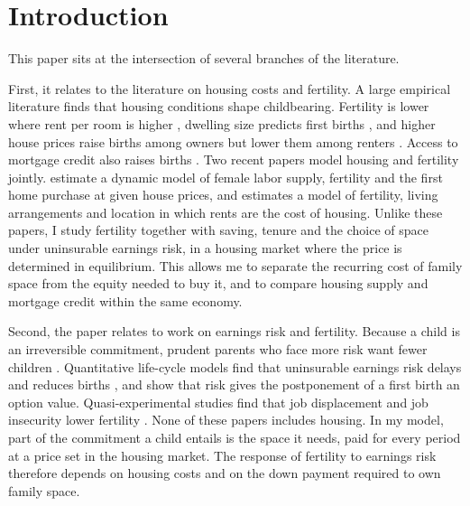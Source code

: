 \section{Introduction}
\label{sec:introduction}


This paper sits at the intersection of several branches of the literature.

First, it relates to the literature on housing costs and fertility. A large
empirical literature finds that housing conditions shape childbearing.
Fertility is lower where rent per room is higher
\citep{simonTamuraHigherRents2009}, dwelling size predicts first births
\citep{stromHousingFirstBirths2010}, and higher house prices raise births
among owners but lower them among renters
\citep{dettlingHousePricesBirth2014,lovenheimFamilyWealthShocks2013}. Access
to mortgage credit also raises births
\citep{hacamoBabiesMortgageDeregulation2021,cummingMonetaryPolicyBirth2024,dettlingKearneyModernMortgage2025,vandoornikFazioRamadoraiSkrastinsHousingFertility2025}.
Two recent papers model housing and fertility jointly.
\citet{khorunzhinaMillerAmericanDream2022} estimate a dynamic model of female
labor supply, fertility and the first home purchase at given house prices,
and \citet{couillardBuildBabyBuild2025} estimates a model of fertility,
living arrangements and location in which rents are the cost of housing.
Unlike these papers, I study fertility together with saving, tenure and the
choice of space under uninsurable earnings risk, in a housing market where
the price is determined in equilibrium. This allows me to separate the
recurring cost of family space from the equity needed to buy it, and to
compare housing supply and mortgage credit within the same economy.

Second, the paper relates to work on earnings risk and fertility. Because a
child is an irreversible commitment, prudent parents who face more risk want
fewer children \citep{fraserIncomeRisk2001}. Quantitative life-cycle models
find that uninsurable earnings risk delays and reduces births
\citep{sommerFertilityChoiceLife2016,ejrnaesJorgensenFamilyPlanning2020,nakakuniFertilityIncomeUncertainty2026},
and \citet{deLaCroixPommeretChildbearing2021} show that risk gives the
postponement of a first birth an option value. Quasi-experimental studies
find that job displacement and job insecurity lower fertility
\citep{delBonoWeberWinterEbmer2012,clarkLepinteurJobInsecurity2022}. None of
these papers includes housing. In my model, part of the commitment a child
entails is the space it needs, paid for every period at a price set in the
housing market. The response of fertility to earnings risk therefore depends
on housing costs and on the down payment required to own family space.

